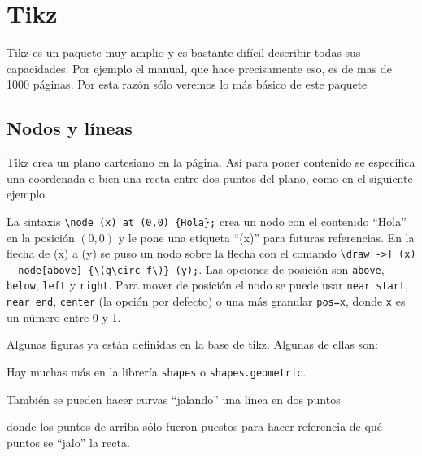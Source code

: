 
\chapter{Tikz}
Tikz es un paquete muy amplio y es bastante difícil describir todas sus
capacidades. Por ejemplo el manual, que hace precisamente eso, es de mas de
\num{1000} páginas. Por esta razón sólo veremos lo más básico de este paquete

\section{Nodos y líneas}%
\label{sec:basic}
Tikz crea un plano cartesiano en la página. Así para poner contenido se
específica una coordenada o bien una recta entre dos puntos del plano, como
en el siguiente ejemplo.
\begin{center}
\end{center}
La sintaxis \verb|\node (x) at (0,0) {Hola};| crea un nodo con el contenido
\enquote{Hola} en la posición \((0,0)\) y le pone una etiqueta \enquote{(x)} para futuras
referencias. En la flecha de (x) a (y) se puso un nodo sobre la flecha con
el comando \verb|\draw[->] (x) --node[above] {\(g\circ f\)} (y);|. Las
opciones de posición son \texttt{above}, \texttt{below}, \texttt{left} y
\texttt{right}. Para mover de posición el nodo se puede usar \texttt{near
start}, \texttt{near end}, \texttt{center} (la opción por defecto) o una más
granular \texttt{pos=x}, donde \texttt{x} es un número entre 0 y 1.

Algunas figuras ya están definidas en la base de tikz. Algunas de ellas son:
\begin{center}
\end{center}
Hay muchas más en la librería \texttt{shapes} o \texttt{shapes.geometric}.

También se pueden hacer curvas \enquote{jalando} una línea en dos puntos
\begin{center}
\end{center}
donde los puntos de arriba sólo fueron puestos para hacer referencia de qué
puntos se \enquote{jalo} la recta.

